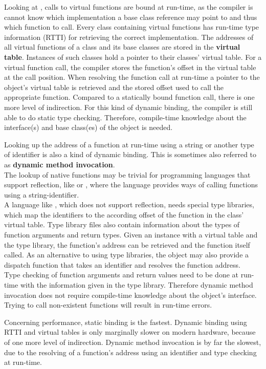 Looking at , calls to virtual functions are bound at run-time, as the compiler is cannot know which implementation a base class reference may point to and thus which function to call. Every class containing virtual functions has run-time type information (RTTI) for retrieving the correct implementation. The addresses of all virtual functions of a class and its base classes are stored in the \textbf{virtual table}. Instances of such classes hold a pointer to their classes' virtual table. For a virtual function call, the compiler stores the function's offset in the virtual table at the call position. When resolving the function call at run-time a pointer to the object's virtual table is retrieved and the stored offset used to call the appropriate function. Compared to a statically bound function call, there is one more level of indirection. For this kind of dynamic binding, the compiler is still able to do static type checking. Therefore, compile-time knowledge about the interface(s) and base class(es) of the object is needed. 

Looking up the address of a function at run-time using a string or another type of identifier is also a kind of dynamic binding. This is sometimes also referred to as \textbf{dynamic method invocation}.\\
The lookup of native functions may be trivial for programming languages that support reflection, like  or , where the language provides ways of calling functions using a string-identifier.\\
A language like , which does not support reflection, needs special type libraries, which map the identifiers to the according offset of the function in the class' virtual table. Type library files also contain information about the types of function arguments and return types. Given an instance with a virtual table and the type library, the function's address can be retrieved and the function itself called. As an alternative to using type libraries, the object may also provide a dispatch function that takes an identifier and resolves the function address.
\\Type checking of function arguments and return values need to be done at run-time with the information given in the type library. Therefore dynamic method invocation does not require compile-time knowledge about the object's interface. Trying to call non-existent functions will result in run-time errors.

Concerning performance, static binding is the fastest. Dynamic binding using RTTI and virtual tables is only marginally slower on modern hardware, because of one more level of indirection. Dynamic method invocation is by far the slowest, due to the resolving of a function's address using an identifier and type checking at run-time. 

